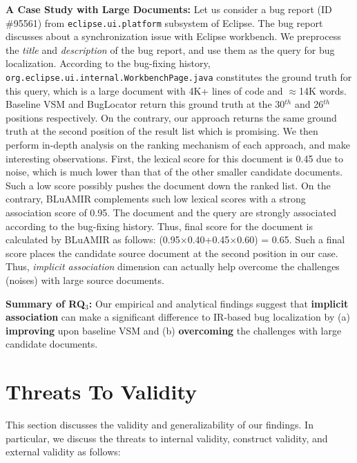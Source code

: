 \documentclass[sigconf,review,anonymous]{acmart}
\begin{document}
\textbf{A Case Study with Large Documents:} Let us consider a bug report (ID \#95561) from \texttt{eclipse.ui.platform} subsystem of Eclipse. The bug report discusses about a synchronization issue with Eclipse workbench. We preprocess the \emph{title} and \emph{description} of the bug report, and use them as the query for bug localization. According to the bug-fixing history, \texttt{org.eclipse.ui.internal.WorkbenchPage.java} constitutes the ground truth for this query, which is a large document with 4K+ lines of code and $\approx$14K words. Baseline VSM \cite{vector-space-model} and BugLocator \cite{Jian} return this ground truth at the 30$^{th}$ and 26$^{th}$ positions respectively. On the contrary, our approach returns the same ground truth at the second position of the result list which is promising. We then perform in-depth analysis on the ranking mechanism of each approach, and make interesting observations. First, the lexical score for this document is 0.45 due to noise, which is much lower than that of the other smaller candidate documents. Such a low score possibly pushes the document down the ranked list. On the contrary, BLuAMIR complements such low lexical scores with a strong association score of 0.95. The document and the query are strongly associated according to the bug-fixing history. Thus, final score for the document is calculated by BLuAMIR as follows:  (0.95$\times$0.40+0.45$\times$0.60) = 0.65. Such a final score places the candidate source document at the second position in our case. Thus, \emph{implicit association} dimension can actually help overcome the challenges (noises) with large source documents. 

\begin{framed}
	\noindent
	\textbf{Summary of RQ$_3$:} Our empirical and analytical findings suggest that \textbf{implicit association} can make a significant difference to IR-based bug localization by (a) \textbf{improving} upon baseline VSM and (b) \textbf{overcoming} the challenges with large candidate documents.    
\end{framed}

\section{Threats To Validity}\label{sec:threats}
This section discusses the validity and generalizability of our findings. In particular, we discuss the threats to internal validity, construct validity, and external validity as follows:
\end{document}
